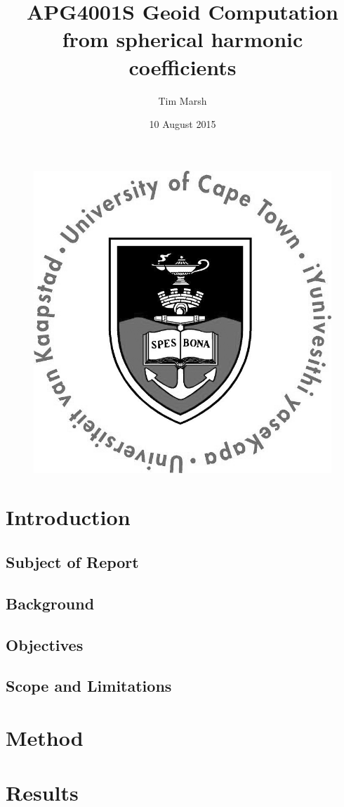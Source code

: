 \documentclass[12pt,a4paper]{article}
\title{APG4001S Geoid Computation from spherical harmonic coefficients}
\date{10 August 2015}
\author{Tim Marsh}
\begin{document}
	
	\maketitle
	\begin{figure}[H]
		\centering
		\includegraphics[width=0.7\linewidth]{UCTcircular_logo1_CMYK}
		\label{fig:UCTcircular_logo1_CMYK}
	\end{figure}
	\newpage
	\tableofcontents
	
	\newpage
	\section{Introduction}
	
	\subsection{Subject of Report}

	
	\subsection{Background}


	
	\subsection{Objectives}
	
	\subsection{Scope and Limitations}
 
	
	\newpage
	\section{Method}
	
	
	\newpage
	\section{Results}

	
	
\end{document}
